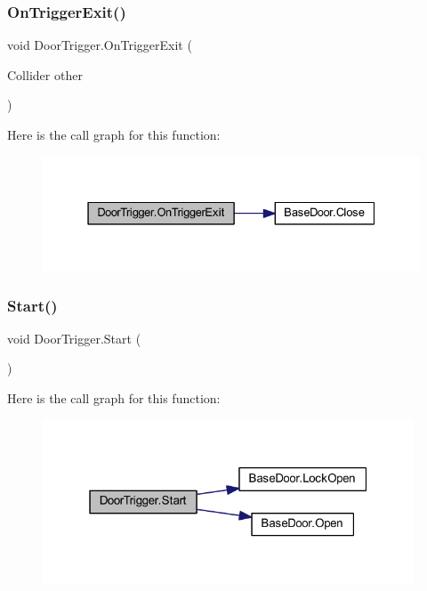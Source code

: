 \subsubsection{\texorpdfstring{On\+Trigger\+Exit()}{OnTriggerExit()}}
{\footnotesize\ttfamily void Door\+Trigger.\+On\+Trigger\+Exit (\begin{DoxyParamCaption}\item[{Collider}]{other }\end{DoxyParamCaption})\hspace{0.3cm}{\ttfamily [private]}}

Here is the call graph for this function\+:
\nopagebreak
\begin{figure}[H]
\begin{center}
\leavevmode
\includegraphics[width=331pt]{class_door_trigger_adee54426b691466c5d667b912816bb56_cgraph}
\end{center}
\end{figure}
\mbox{\label{class_door_trigger_a3b079888a26feb3139b6a0507b89c65c}} 
\subsubsection{\texorpdfstring{Start()}{Start()}}
{\footnotesize\ttfamily void Door\+Trigger.\+Start (\begin{DoxyParamCaption}{ }\end{DoxyParamCaption})\hspace{0.3cm}{\ttfamily [private]}}

Here is the call graph for this function\+:
\nopagebreak
\begin{figure}[H]
\begin{center}
\leavevmode
\includegraphics[width=313pt]{class_door_trigger_a3b079888a26feb3139b6a0507b89c65c_cgraph}
\end{center}
\end{figure}


